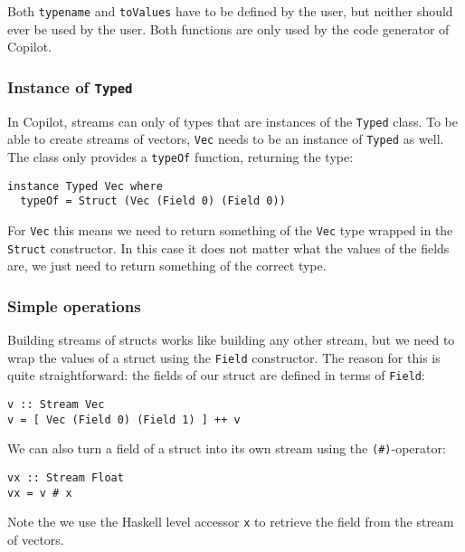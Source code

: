 Both \texttt{typename} and \texttt{toValues} have to be defined by the user,
but neither should ever be used by the user. Both functions are only used by
the code generator of Copilot.


\subsubsection*{Instance of \texttt{Typed}}
In Copilot, streams can only of types that are instances of the \texttt{Typed}
class. To be able to create streams of vectors, \texttt{Vec} needs to be an
instance of \texttt{Typed} as well. The class only provides a \texttt{typeOf}
function, returning the type:
\begin{lstlisting}[language=Copilot]
instance Typed Vec where
  typeOf = Struct (Vec (Field 0) (Field 0))
\end{lstlisting}
For \texttt{Vec} this means we need to return something of the \texttt{Vec}
type wrapped in the \texttt{Struct} constructor. In this case it does not
matter what the values of the fields are, we just need to return something of
the correct type.


\subsubsection*{Simple operations}
Building streams of structs works like building any other stream, but we need
to wrap the values of a struct using the \texttt{Field} constructor. The reason
for this is quite straightforward: the fields of our struct are defined in
terms of \texttt{Field}:
\begin{lstlisting}[language=Copilot]
v :: Stream Vec
v = [ Vec (Field 0) (Field 1) ] ++ v
\end{lstlisting}

We can also turn a field of a struct into its own stream using the
\texttt{(\#)}-operator:
\begin{lstlisting}[language=Copilot]
vx :: Stream Float
vx = v # x
\end{lstlisting}
Note the we use the Haskell level accessor \texttt{x} to retrieve the field
from the stream of vectors.


